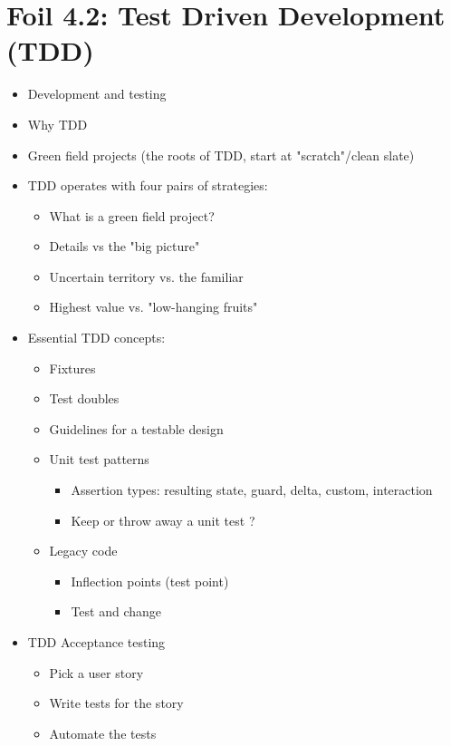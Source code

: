 	\section{Foil 4.2: Test Driven Development (TDD)}
		\begin{itemize}
			\item Development and testing
			\item Why TDD
			\item Green field projects (the roots of TDD, start at "scratch"/clean slate)
			\item TDD operates with four pairs of strategies:
				\begin{itemize}
					\item What is a green field project?
					\item Details vs the "big picture"
					\item Uncertain territory vs. the familiar
					\item Highest value vs. "low-hanging fruits"
				\end{itemize}
			\item Essential TDD concepts:
				\begin{itemize}
					\item Fixtures
					\item Test doubles
					\item Guidelines for a testable design
					\item Unit test patterns 
						\begin{itemize}
							\item Assertion types: resulting state, guard, delta, custom, interaction
							\item Keep or throw away a unit test ?
						\end{itemize}
					\item Legacy code 
						\begin{itemize}
							\item Inflection points (test point)
							\item Test and change
						\end{itemize}
				\end{itemize}
			\item TDD Acceptance testing
				\begin{itemize}
					\item Pick a user story
					\item Write tests for the story
					\item Automate the tests
				\end{itemize}
		\end{itemize}

